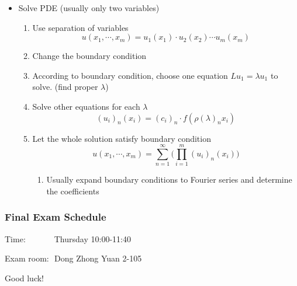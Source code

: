 \documentclass{beamer}
\begin{document}
\begin{frame}
\begin{itemize}
\item Solve PDE (usually only two variables)

\begin{enumerate}
\item Use separation of variables
$$u(x_1,\cdots, x_m) = u_1(x_1) \cdot u_2(x_2) \cdots u_m(x_m)$$

\item Change the boundary condition
\item  According to boundary condition, choose one equation $L u_1=\lambda u_1$ to solve. (find proper $\lambda$)
\item Solve other equations for each $\lambda$
$$(u_i)_n(x_i)=(c_i)_n\cdot f(\rho(\lambda)_nx_i)$$
\item Let the whole solution satisfy boundary condition 
$$u(x_1,\cdots,x_m)=\sum\limits_{n=1}^{\infty}\Big(\prod\limits_{i=1}^m(u_i)_n(x_i)\Big)$$
\begin{enumerate}
\item Usually expand boundary conditions to Fourier series and determine the coefficients
\end{enumerate}
\end{enumerate}
\end{itemize}
\end{frame}

\begin{frame}
\frametitle{Final Exam Schedule}
\LARGE 
Time: \,\,\,\,\,\,\,\,\,\,\,\,\,\,\,\,\, Thursday 10:00-11:40

Exam room: \,\,Dong Zhong Yuan 2-105

\end{frame}
\begin{frame}
\Huge
\centering 
Good luck!\\
\end{frame}
\end{document}

